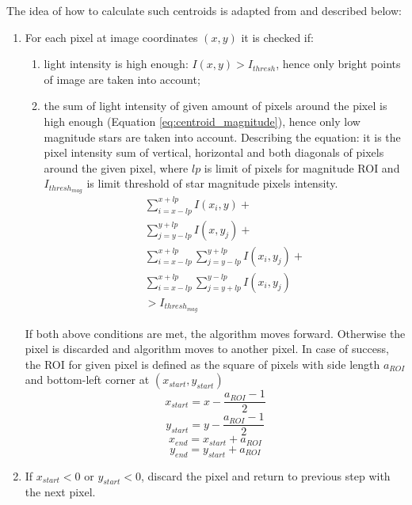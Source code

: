 \documentclass[12pt,a4paper,twoside]{article}
\begin{document}
The idea of how to calculate such centroids is adapted from \citet{mcbryde2012star} and described below:

\begin{enumerate}
\item For each pixel at image coordinates $(x,y)$ it is checked if:
\begin{enumerate}
\item light intensity is high enough: $I(x,y) > I_{thresh}$, hence only bright points of image are taken into account;
\item the sum of light intensity of given amount of pixels around the pixel is high enough (Equation \ref{eq:centroid_magnitude}), hence only low magnitude stars are taken into account. Describing the equation: it is the pixel intensity sum of vertical, horizontal and both diagonals of pixels around the given pixel, where $lp$ is limit of pixels for magnitude ROI and $I_{thresh_{mag}}$ is limit threshold of star magnitude pixels intensity.
\begin{equation}
\begin{gathered}
\sum_{i=x-lp}^{x+lp} I(x_i,y) +  \\ 
\sum_{j=y-lp}^{y+lp} I(x,y_j) +  \\ 
\sum_{i=x-lp}^{x+lp}\sum_{j=y-lp}^{y+lp} I(x_i,y_j) +  \\ 
\sum_{i=x-lp}^{x+lp}\sum_{j=y+lp}^{y-lp} I(x_i,y_j) \\ 
> I_{thresh_{mag}}
\end{gathered}
\label{eq:centroid_magnitude}
\end{equation}

\end{enumerate}
If both above conditions are met, the algorithm moves forward. Otherwise the pixel is discarded and algorithm moves to another pixel.
In case of success, the ROI for given pixel is defined as the square of pixels with side length $a_{ROI}$ and bottom-left corner at $(x_{start},y_{start})$
\begin{equation}
x_{start} = x - \frac{a_{ROI} - 1}{2}
\end{equation}
\begin{equation}
y_{start} = y - \frac{a_{ROI} - 1}{2}
\end{equation}
\begin{equation}
x_{end} = x_{start} + a_{ROI}
\end{equation}
\begin{equation}
y_{end} = y_{start} + a_{ROI}
\end{equation}
\item If $x_{start} < 0$ or $y_{start} < 0$, discard the pixel and return to previous step with the next pixel.


\end{enumerate}
\end{document}
